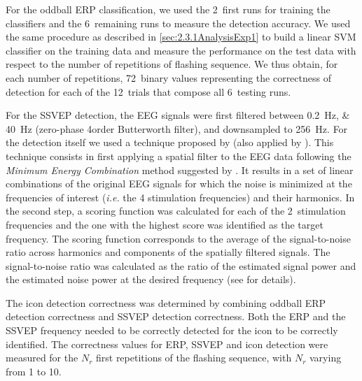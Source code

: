 \documentclass[10pt]{article}
\begin{document}
        For the oddball ERP classification, we used the 2~first runs for training the classifiers and the 6~remaining runs to measure the detection accuracy.
        We used the same procedure as described in \autoref{sec:2.3.1AnalysisExp1} to build a linear SVM classifier on the training data and measure the performance on the test data with respect to the number of repetitions of flashing sequence.
        We thus obtain, for each number of repetitions, 72~binary values representing the correctness of detection for each of the 12~trials that compose all 6~testing runs.

        For the SSVEP detection, the \ac{EEG} signals were first filtered between \SIlist[list-units = single]{0.2;40}{\Hz} (zero-phase 4\nth order Butterworth filter), and downsampled to \SI{256}{\Hz}.
        For the detection itself we used a technique proposed by \textcite{Friman.2007} (also applied by \cite{Chumerin2011, Segers2011}).
        This technique consists in first applying a spatial filter to the EEG data following the \emph{Minimum Energy Combination} method suggested by \textcite{Friman.2007}.
        It results in a set of linear combinations of the original EEG signals for which the noise is minimized at the frequencies of interest (\emph{i.e.} the 4 stimulation frequencies) and their harmonics.
        In the second step, a scoring function was calculated for each of the 2~stimulation frequencies and the one with the highest score was identified as the target frequency.
        The scoring function corresponds to the average of the signal-to-noise ratio across harmonics and components of the spatially filtered signals.
        The signal-to-noise ratio was calculated as the ratio of the estimated signal power and the estimated noise power at the desired frequency (see \cite{Friman.2007, Chumerin2011} for details).

        The icon detection correctness was determined by combining oddball ERP detection correctness and SSVEP detection correctness.
        Both the ERP and the SSVEP frequency needed to be correctly detected for the icon to be correctly identified.
        The correctness values for ERP, SSVEP and icon detection were measured for the $N_r$ first repetitions of the flashing sequence, with $N_r$ varying from 1 to 10.
\end{document}
